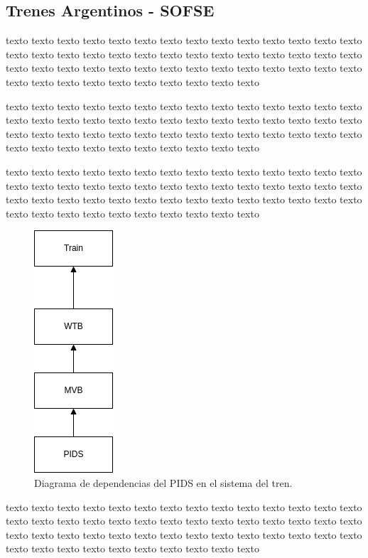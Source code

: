 \documentclass[
11pt, %
]{charter}
\begin{document}
\pagebreak
\subsection{Trenes Argentinos - SOFSE}

texto texto texto texto texto texto texto texto texto texto texto texto texto texto texto texto texto texto texto texto texto texto texto texto texto texto texto texto texto texto texto texto texto texto texto texto texto texto texto texto texto texto texto texto texto texto texto texto texto texto texto texto 


texto texto texto texto texto texto texto texto texto texto texto texto texto texto texto texto texto texto texto texto texto texto texto texto texto texto texto texto texto texto texto texto texto texto texto texto texto texto texto texto texto texto texto texto texto texto texto texto texto texto texto texto 


texto texto texto texto texto texto texto texto texto texto texto texto texto texto texto texto texto texto texto texto texto texto texto texto texto texto texto texto texto texto texto texto texto texto texto texto texto texto texto texto texto texto texto texto texto texto texto texto texto texto texto texto 



\begin{figure}[htpb]
\centering
\includegraphics[scale=0.5]{./Pics/clasesTrainPIDS.png}
\caption{Diagrama de dependencias del PIDS en el sistema del tren.}
\label{fig:Clases Train-PIDS}
\end{figure}



texto texto texto texto texto texto texto texto texto texto texto texto texto texto texto texto texto texto texto texto texto texto texto texto texto texto texto texto texto texto texto texto texto texto texto texto texto texto texto texto texto texto texto texto texto texto texto texto texto texto texto texto 
\end{document}
